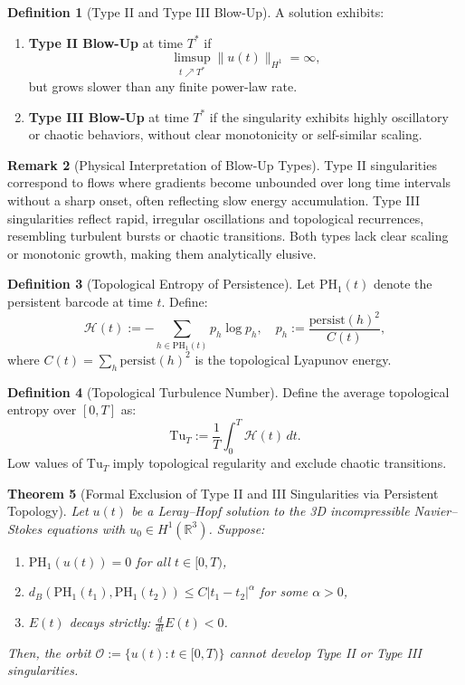 \documentclass[11pt]{article}
\newtheorem{theorem}{Theorem}[section]
\theoremstyle{definition}
\newtheorem{definition}[theorem]{Definition}
\newtheorem{remark}[theorem]{Remark}
\begin{document}
\begin{definition}[Type II and Type III Blow-Up]
A solution exhibits:
\begin{enumerate}
  \item \textbf{Type II Blow-Up} at time $T^*$ if
  \[
  \limsup_{t \nearrow T^*} \|u(t)\|_{H^1} = \infty,
  \]
  but grows slower than any finite power-law rate.

  \item \textbf{Type III Blow-Up} at time $T^*$ if the singularity exhibits highly oscillatory or chaotic behaviors, without clear monotonicity or self-similar scaling.
\end{enumerate}
\end{definition}

\begin{remark}[Physical Interpretation of Blow-Up Types]
Type II singularities correspond to flows where gradients become unbounded over long time intervals without a sharp onset, often reflecting slow energy accumulation. Type III singularities reflect rapid, irregular oscillations and topological recurrences, resembling turbulent bursts or chaotic transitions. Both types lack clear scaling or monotonic growth, making them analytically elusive.
\end{remark}

\begin{definition}[Topological Entropy of Persistence]
Let $\mathrm{PH}_1(t)$ denote the persistent barcode at time $t$. Define:
\[
\mathcal{H}(t) := -\sum_{h \in \mathrm{PH}_1(t)} p_h \log p_h, \quad p_h := \frac{\mathrm{persist}(h)^2}{C(t)},
\]
where $C(t) = \sum_{h} \mathrm{persist}(h)^2$ is the topological Lyapunov energy.
\end{definition}

\begin{definition}[Topological Turbulence Number]
Define the average topological entropy over $[0,T]$ as:
\[
\mathrm{Tu}_T := \frac{1}{T} \int_0^T \mathcal{H}(t) \, dt.
\]
Low values of $\mathrm{Tu}_T$ imply topological regularity and exclude chaotic transitions.
\end{definition}

\begin{theorem}[Formal Exclusion of Type II and III Singularities via Persistent Topology]
\label{thm:formal_typeII_III_exclusion}
Let $u(t)$ be a Leray--Hopf solution to the 3D incompressible Navier--Stokes equations with $u_0 \in H^1(\mathbb{R}^3)$. Suppose:
\begin{enumerate}
    \item $\mathrm{PH}_1(u(t)) = 0$ for all $t \in [0, T)$,
    \item $d_B(\mathrm{PH}_1(t_1), \mathrm{PH}_1(t_2)) \le C |t_1 - t_2|^\alpha$ for some $\alpha > 0$,
    \item $E(t)$ decays strictly: $\frac{d}{dt} E(t) < 0$.
\end{enumerate}
Then, the orbit $\mathcal{O} := \{u(t): t \in [0,T)\}$ cannot develop Type II or Type III singularities.
\end{theorem}
\end{document}
